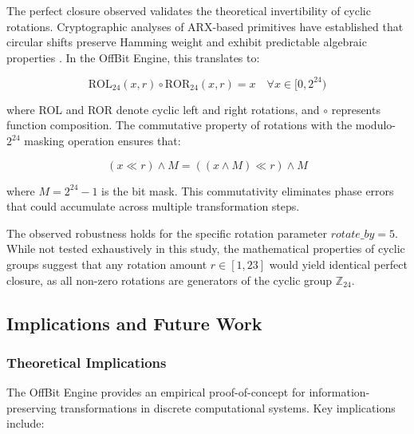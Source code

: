 \documentclass[11pt,letterpaper]{article}
\begin{document}
The perfect closure observed validates the theoretical invertibility of cyclic rotations. Cryptographic analyses of ARX-based primitives have established that circular shifts preserve Hamming weight and exhibit predictable algebraic properties \cite{windarta2022,nist2023}. In the OffBit Engine, this translates to:

\begin{equation}
\text{ROL}_{24}(x, r) \circ \text{ROR}_{24}(x, r) = x \quad \forall x \in [0, 2^{24})
\end{equation}

where ROL and ROR denote cyclic left and right rotations, and $\circ$ represents function composition. The commutative property of rotations with the modulo-$2^{24}$ masking operation ensures that:

\begin{equation}
(x \ll r) \land M = ((x \land M) \ll r) \land M
\end{equation}

where $M = 2^{24} - 1$ is the bit mask. This commutativity eliminates phase errors that could accumulate across multiple transformation steps.

The observed robustness holds for the specific rotation parameter $rotate\_by = 5$. While not tested exhaustively in this study, the mathematical properties of cyclic groups suggest that any rotation amount $r \in [1, 23]$ would yield identical perfect closure, as all non-zero rotations are generators of the cyclic group $\mathbb{Z}_{24}$.

\subsection{Implications and Future Work}
\label{subsec:future}

\subsubsection{Theoretical Implications}

The OffBit Engine provides an empirical proof-of-concept for information-preserving transformations in discrete computational systems. Key implications include:
\end{document}
